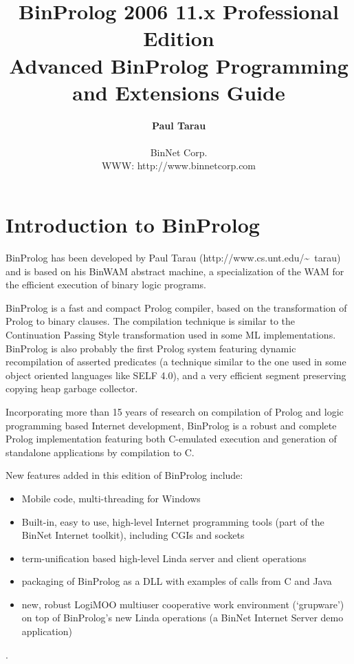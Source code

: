 \documentclass{article}
\begin{document}
\pagestyle{plain}




\title{
\Huge
BinProlog 2006 11.x Professional Edition\\
Advanced BinProlog Programming and Extensions Guide
\vskip 5cm
}


\author{
\Large
  {\bf Paul Tarau}\\\\
\large
  BinNet Corp.\\
  WWW: http://www.binnetcorp.com
\normalsize
}



\vskip 5cm
\maketitle

\newpage
\section{Introduction to BinProlog}

BinProlog has been developed by Paul Tarau (http://www.cs.unt.edu/\~~tarau)
and is based on his BinWAM abstract machine,
a specialization of the WAM
for the efficient execution of binary logic programs.

BinProlog is a fast and compact Prolog compiler, based on the
transformation  of Prolog to binary clauses. The compilation technique
is similar to the Continuation Passing Style transformation used in
some ML implementations. BinProlog  is also probably the first 
Prolog system featuring dynamic recompilation of asserted predicates
(a technique similar to the one used in some object oriented 
languages like SELF 4.0),
and a very efficient segment preserving copying heap garbage collector.

Incorporating more than 15 years of research on compilation of Prolog and
logic programming based Internet development,
BinProlog is a robust and complete Prolog
implementation featuring both C-emulated execution
and generation of standalone applications
by compilation to C.

New features added in this edition of BinProlog include:

\begin{itemize}
\item Mobile code, multi-threading for Windows
\item Built-in, easy to use, high-level Internet programming tools (part of the BinNet Internet toolkit),
including CGIs and sockets
\item term-unification based high-level Linda server and client operations
\item packaging of BinProlog as a DLL with examples of calls from C
and Java
\item new, robust LogiMOO multiuser cooperative work environment (`grupware') on top of BinProlog's new Linda operations
(a BinNet Internet Server demo application)
\end{itemize}.  
\end{document}
